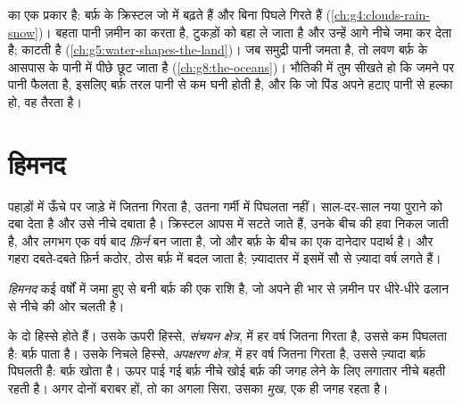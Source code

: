 \begin{recall}
  का एक प्रकार है: बर्फ़ के क्रिस्टल जो  में बढ़ते हैं और बिना पिघले गिरते
हैं (\cref{ch:g4:clouds-rain-snow})। बहता पानी ज़मीन का  करता है, टुकड़ों को बहा
ले जाता है और उन्हें आगे नीचे जमा कर देता है;   काटती है
(\cref{ch:g5:water-shapes-the-land})। जब समुद्री पानी जमता है, तो लवण बर्फ़ के
आसपास के पानी में पीछे छूट जाता है (\cref{ch:g8:the-oceans})। भौतिकी में तुम सीखते
हो कि जमने पर पानी फैलता है, इसलिए बर्फ़ तरल पानी से कम घनी होती है, और कि जो पिंड अपने
हटाए पानी से हल्का हो, वह तैरता
है।
\end{recall}

\section{हिमनद}

पहाड़ों में ऊँचे पर जाड़े में जितना  गिरता है, उतना गर्मी में पिघलता नहीं। साल-दर-साल
नया  पुराने  को दबा देता है और उसे नीचे दबाता है। क्रिस्टल आपस में सटते जाते हैं,
उनके बीच की हवा निकल जाती है, और लगभग एक वर्ष बाद  \emph{फ़िर्न} बन जाता है, जो
 और बर्फ़ के बीच का एक दानेदार पदार्थ है। और गहरा दबते-दबते फ़िर्न कठोर, ठोस बर्फ़ में
बदल जाता है; ज़्यादातर  में इसमें सौ से ज़्यादा वर्ष लगते
हैं।

\begin{definition}[हिमनद]\label{def:g8:ice-on-earth:glacier}
\emph{हिमनद} कई वर्षों में जमा हुए  से बनी बर्फ़ की एक राशि है, जो
अपने ही भार से ज़मीन पर धीरे-धीरे ढलान से नीचे की ओर चलती है।
\end{definition}

 के दो हिस्से होते हैं। उसके ऊपरी हिस्से, \emph{संचयन क्षेत्र}, में हर वर्ष जितना
 गिरता है, उससे कम पिघलता है:  बर्फ़ पाता है। उसके निचले हिस्से,
\emph{अपक्षरण क्षेत्र}, में हर वर्ष जितना  गिरता है, उससे ज़्यादा बर्फ़ पिघलती है:
 बर्फ़ खोता है। ऊपर पाई गई बर्फ़ नीचे खोई बर्फ़ की जगह लेने के लिए लगातार नीचे बहती
रहती है। अगर दोनों बराबर हों, तो  का अगला सिरा, उसका \emph{मुख}, एक ही जगह
रहता है।

